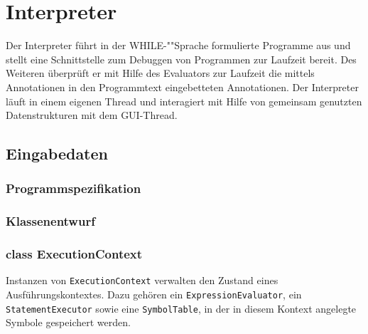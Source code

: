 \section{Interpreter}

Der Interpreter führt in der WHILE-""Sprache formulierte Programme aus und stellt eine Schnittstelle zum Debuggen von Programmen zur Laufzeit bereit. Des Weiteren überprüft er mit Hilfe des Evaluators zur Laufzeit die mittels Annotationen in den Programmtext eingebetteten Annotationen. Der Interpreter läuft in einem eigenen Thread und interagiert mit Hilfe von gemeinsam genutzten Datenstrukturen mit dem GUI-Thread.

\subsection{Eingabedaten}

\subsubsection{Programmspezifikation}


\subsubsection{Klassenentwurf}

\subsubsection{class ExecutionContext}
Instanzen von \texttt{ExecutionContext} verwalten den Zustand eines Ausführungskontextes. Dazu gehören ein \texttt{ExpressionEvaluator}, ein \texttt{StatementExecutor} sowie eine \texttt{SymbolTable}, in der in diesem Kontext angelegte Symbole gespeichert werden.



